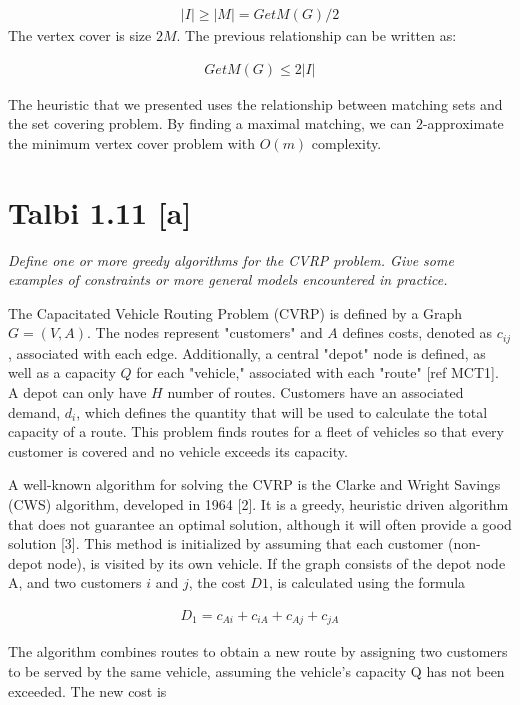 \documentclass[12pt]{article}
\begin{document}
\begin{align*}
|I|  \geq |M| = GetM(G) / 2
\end{align*}
The vertex cover is size $2M$. The previous relationship can be written as:

\begin{align*}
GetM(G) \leq 2 |I|
\end{align*}

The heuristic that we presented uses the relationship between matching sets and the set covering problem. By finding a maximal matching, we can $2$-approximate the minimum vertex cover problem with $O(m)$ complexity.



\section{Talbi 1.11 [a]}

\textit{Define one or more greedy algorithms for the CVRP problem. Give some examples of constraints or more general models encountered in practice.}

The Capacitated Vehicle Routing Problem (CVRP) is defined by a Graph $G = (V, A)$. The nodes represent "customers" and $A$ defines costs, denoted as $c_{ij}$, associated with each edge. Additionally, a central "depot" node is defined, as well as a capacity $Q$ for each "vehicle," associated with each "route" [ref MCT1]. A depot can only have $H$ number of routes. Customers have an associated demand, $d_i$, which defines the quantity that will be used to calculate the total capacity of a route. This problem finds routes for a fleet of vehicles so that every customer is covered and no vehicle exceeds its capacity.

A well-known algorithm for solving the CVRP is the Clarke and Wright Savings (CWS) algorithm, developed in 1964 [2]. It is a greedy, heuristic driven algorithm that does not guarantee an optimal solution, although it will often provide a good solution [3]. This method is initialized by assuming that each customer (non-depot node), is visited by its own vehicle. If the graph consists of the depot node A, and two customers $i$ and $j$, the cost $D1$, is calculated using the formula

\begin{align*}
D_1 = c_{Ai} + c_{iA} + c_{Aj} + c_{jA}
\end{align*}

The algorithm combines routes to obtain a new route by assigning two customers to be served by the same vehicle, assuming the vehicle's capacity Q has not been exceeded. The new cost is
\end{document}
